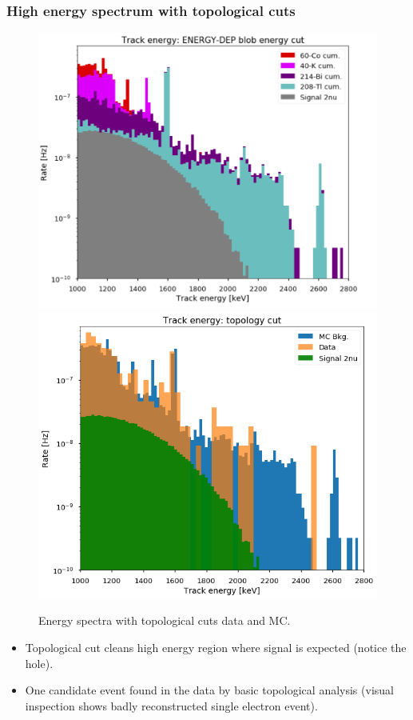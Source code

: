 \begin{frame}
\frametitle{High energy spectrum with topological cuts} 
\begin{figure}
  \begin{center}
    \includegraphics[scale=0.35]{moriond/new_with_topo_log.png}
     \includegraphics[scale=0.30]{moriond/energy_spectrum_total.png}
    
    \caption{Energy spectra with topological cuts data and MC. }
    \label{fig:rate}
  \end{center}
\end{figure}
\begin{itemize}
\item Topological cut cleans high energy region where signal is expected (notice the hole). 
\item One candidate event found in the data by basic topological analysis (visual inspection shows badly reconstructed single electron event).  
\end{itemize}
\end{frame}





